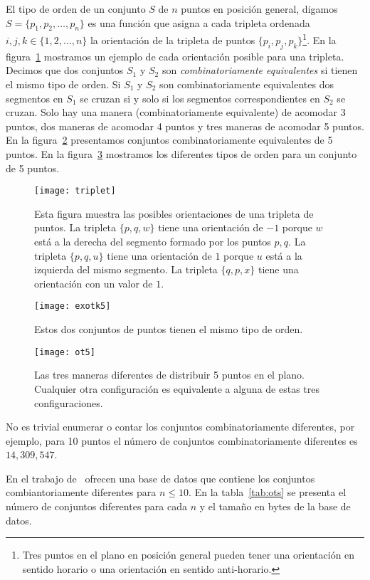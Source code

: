 El tipo de orden de un conjunto $S$ de $n$ puntos en posición general, digamos
$S=\{p_1,p_2,\dots,p_n\}$ es una función que asigna a cada tripleta ordenada
$i,j,k \in \{1,2,\dots,n\}$ la orientación de la tripleta de puntos $\{p_i,p_j,p_k\}$\footnote{
Tres puntos en el plano en posición general pueden tener una orientación en sentido horario
o una orientación en sentido anti-horario.}. En la figura~\ref{fig:triplet} mostramos un ejemplo de
cada orientación posible para una tripleta.
Decimos que dos conjuntos $S_1$ y $S_2$ son \emph{combinatoriamente equivalentes} si
tienen el mismo tipo de orden. Si $S_1$ y $S_2$ son combinatoriamente equivalentes
dos segmentos en $S_1$ se cruzan si y solo si los segmentos correspondientes en $S_2$
se cruzan. Solo hay una manera (combinatoriamente equivalente) de acomodar 3 puntos,
dos maneras de acomodar 4 puntos y tres maneras de acomodar 5 puntos.
En la figura~\ref{fig:exotk5} presentamos conjuntos
combinatoriamente equivalentes de 5 puntos. En la figura~\ref{fig:ot5}
mostramos los diferentes tipos de orden para un conjunto de 5 puntos.
\begin{figure}[htpb]
  \centering
  \texttt{[image: triplet]}
  \caption{Esta figura muestra las posibles orientaciones de una tripleta de puntos. La tripleta $\{p,q,w\}$ tiene
  una orientación de $-1$ porque $w$ está a la derecha del segmento formado por los puntos $p,q$. La tripleta $\{p,q,u\}$ tiene
  una orientación de $1$  porque $u$ está a la izquierda del mismo segmento. La tripleta $\{q,p,x\}$ tiene una orientación
  con un valor de $1$.}
  \label{fig:triplet}
\end{figure}
\begin{figure}[htpb]
  \centering
  \texttt{[image: exotk5]}
  \caption{Estos dos conjuntos de puntos tienen el mismo tipo de orden.}
  \label{fig:exotk5}
\end{figure}
\begin{figure}[htpb]
  \centering
  \texttt{[image: ot5]}
  \caption{Las tres maneras diferentes de distribuir 5 puntos en el plano. Cualquier
  otra configuración es equivalente a alguna de estas tres configuraciones.}
  \label{fig:ot5}
\end{figure}

No es trivial enumerar o contar los conjuntos combinatoriamente diferentes, por ejemplo,
para 10 puntos el número de conjuntos combinatoriamente diferentes es $14,309,547$.

En el trabajo de~\cite{Aichholzer2002} ofrecen una base de datos que contiene los conjuntos
combiantoriamente diferentes para $n\leq 10$. En la tabla~\ref{tab:ots} se presenta el número
de conjuntos diferentes para cada $n$ y el tamaño en bytes de la base de datos.

